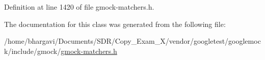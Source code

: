 Definition at line 1420 of file gmock-\/matchers.\+h.



The documentation for this class was generated from the following file\+:\begin{DoxyCompactItemize}
\item 
/home/bhargavi/\+Documents/\+S\+D\+R/\+Copy\+\_\+\+Exam\+\_\+X/vendor/googletest/googlemock/include/gmock/\hyperlink{gmock-matchers_8h}{gmock-\/matchers.\+h}\end{DoxyCompactItemize}

